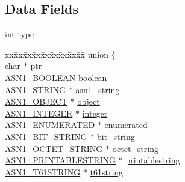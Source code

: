\subsection*{Data Fields}
\begin{DoxyCompactItemize}
\item 
int \hyperlink{structasn1__type__st_ac765329451135abec74c45e1897abf26}{type}
\item 
\begin{tabbing}
xx\=xx\=xx\=xx\=xx\=xx\=xx\=xx\=xx\=\kill
union \{\\
\>char $\ast$ \hyperlink{structasn1__type__st_a935adc2e417a61d7eb6f04efb18ba031}{ptr}\\
\>\hyperlink{crypto_2ossl__typ_8h_abab3d5c6a3b9e049d27737dc227c0849}{ASN1\_BOOLEAN} \hyperlink{structasn1__type__st_a14e2ea490f3d04965733f623003aed68}{boolean}\\
\>\hyperlink{crypto_2ossl__typ_8h_ad37610875e38aa6c59f5e6e0b437e65c}{ASN1\_STRING} $\ast$ \hyperlink{structasn1__type__st_ab09b0caaa3250409130212f7234cdcf5}{asn1\_string}\\
\>\hyperlink{crypto_2ossl__typ_8h_ae3fda0801e4c8e250087052bafb3ce2e}{ASN1\_OBJECT} $\ast$ \hyperlink{structasn1__type__st_a1f8ab7ec8f0e99d20b1854c3133f7de3}{object}\\
\>\hyperlink{crypto_2ossl__typ_8h_af4335399bf9774cb410a5e93de65998b}{ASN1\_INTEGER} $\ast$ \hyperlink{structasn1__type__st_ac60f0808be3e00864217edcdcdf63e0b}{integer}\\
\>\hyperlink{crypto_2ossl__typ_8h_a4b87b1c33899eb49377f298e8a8b9850}{ASN1\_ENUMERATED} $\ast$ \hyperlink{structasn1__type__st_a172d4eab32fb61906327fbc2d3d8e358}{enumerated}\\
\>\hyperlink{crypto_2ossl__typ_8h_af837aaa00e151b1e8773aea5a8fe1cc4}{ASN1\_BIT\_STRING} $\ast$ \hyperlink{structasn1__type__st_aa420c689b4bb551c72540771bced9210}{bit\_string}\\
\>\hyperlink{crypto_2ossl__typ_8h_afbd05e94e0f0430a2b729473efec88c1}{ASN1\_OCTET\_STRING} $\ast$ \hyperlink{structasn1__type__st_a733e7676078293f6df0b0d17a4258c31}{octet\_string}\\
\>\hyperlink{crypto_2ossl__typ_8h_a0d7a94b1f271c071ca99ad8ea0a8907b}{ASN1\_PRINTABLESTRING} $\ast$ \hyperlink{structasn1__type__st_aba8fbb19b8cd489cce9b92388d43d11b}{printablestring}\\
\>\hyperlink{crypto_2ossl__typ_8h_a222d8715184df2c8c41745c6dda0df72}{ASN1\_T61STRING} $\ast$ \hyperlink{structasn1__type__st_ad27bb55392c218b20d54a9558c8cde90}{t61string}\\

\end{tabbing}
\end{DoxyCompactItemize}
